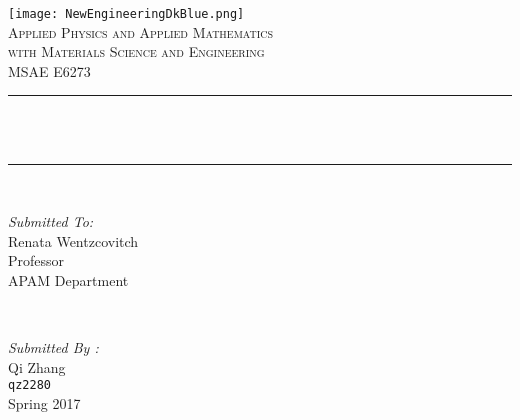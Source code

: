 \begin{titlepage}
	\centering
	\vspace*{0.5 cm}
	\texttt{[image: NewEngineeringDkBlue.png]}\\[1.0 cm]	%
	\textsc{\Large Applied Physics and Applied Mathematics\\
		\large with Materials Science and Engineering}\\[2.0 cm]	%
	\textsc{\Large MSAE E6273}\\[0.5 cm]				%
	\rule{\linewidth}{0.2 mm} \\[0.4 cm]
	{ \huge \bfseries \thetitle}\\
	\rule{\linewidth}{0.2 mm} \\[1.5 cm]

	\begin{minipage}{0.4\textwidth}
		\begin{flushleft} \large
			\emph{Submitted To:}\\
			Renata Wentzcovitch\\
			Professor\\
			APAM Department\\
		\end{flushleft}
	\end{minipage}~
	\begin{minipage}{0.4\textwidth}

		\begin{flushright} \large
			\emph{Submitted By :} \\
			Qi Zhang\\
			\texttt{qz2280}\\
			Spring 2017\\
		\end{flushright}

	\end{minipage}\\[2 cm]
\end{titlepage}
